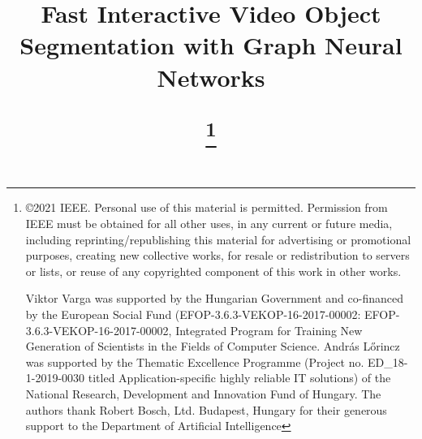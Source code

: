 \documentclass[conference]{IEEEtran}
\begin{document}
\title{Fast Interactive Video Object Segmentation with Graph Neural Networks

\thanks{\copyright 2021 IEEE.  Personal use of this material is permitted.  Permission from IEEE must be obtained for all other uses, in any current or future media, including reprinting/republishing this material for advertising or promotional purposes, creating new collective works, for resale or redistribution to servers or lists, or reuse of any copyrighted component of this work in other works.

Viktor Varga was supported by the Hungarian Government and co-financed by the European Social Fund (EFOP-3.6.3-VEKOP-16-2017-00002: EFOP-3.6.3-VEKOP-16-2017-00002, Integrated Program for Training New Generation of Scientists in the Fields of Computer Science. Andr\'as L\H{o}rincz was supported by the Thematic Excellence Programme (Project no. ED\_18-1-2019-0030 titled Application-specific highly reliable IT solutions) of the National Research, Development and Innovation Fund of Hungary. The authors thank Robert Bosch, Ltd. Budapest, Hungary for their generous support to the Department of Artificial Intelligence}
}

\author{
\and
{}
}

\maketitle
\end{document}
